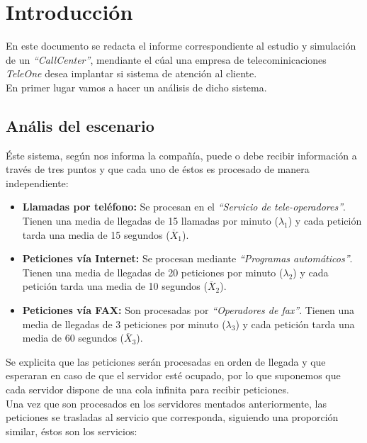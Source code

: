 \section{Introducción}

En este documento se redacta el informe correspondiente al estudio y simulación de un \emph{``CallCenter''}, mendiante el cúal una empresa de telecominicaciones \emph{TeleOne} desea implantar si sistema de atención al cliente.\\

En primer lugar vamos a hacer un análisis de dicho sistema.

\subsection{Anális del escenario}
Éste sistema, según nos informa la compañía, puede o debe recibir información a través de tres puntos y que cada uno de éstos es procesado de manera independiente:

\begin{itemize}
  \item \textbf{Llamadas por teléfono:} Se procesan en el \emph{``Servicio de tele-operadores''}. Tienen una media de llegadas de 15 llamadas por minuto ($\lambda_{1}$) y cada petición tarda una media de 15 segundos ($\overline{X}_{1}$).
  \item \textbf{Peticiones vía Internet:} Se procesan mediante \emph{``Programas automáticos''}. Tienen una media de llegadas de 20 peticiones por minuto ($\lambda_{2}$) y cada petición tarda una media de 10 segundos ($\overline{X}_{2}$).
  \item \textbf{Peticiones vía FAX:} Son procesadas por \emph{``Operadores de fax''}. Tienen una media de llegadas de 3 peticiones por minuto ($\lambda_{3}$) y cada petición tarda una media de 60 segundos ($\overline{X}_{3}$).
\end{itemize}

Se explicita que las peticiones serán procesadas en orden de llegada y que esperaran en caso de que el servidor esté ocupado, por lo que suponemos que cada servidor dispone de una cola infinita para recibir peticiones.\\

Una vez que son procesados en los servidores mentados anteriormente, las peticiones se trasladas al servicio que corresponda, siguiendo una proporción similar, éstos son los servicios:


